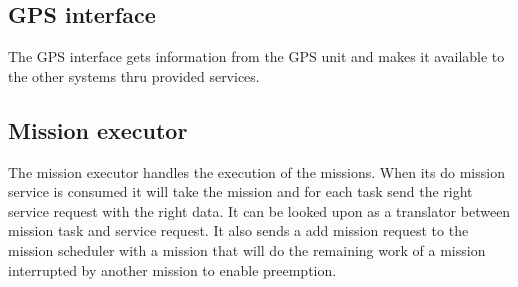 \documentclass{article}
\begin{document}
\subsection{GPS interface}
The GPS interface gets information from the GPS unit and makes it available to the other systems thru provided services.

\subsection{Mission executor}
The mission executor handles the execution of the missions. When its do mission service is consumed it will take the mission and for each task send the right service request with the right data. It can be looked upon as a translator between mission task and service request.
It also sends a add mission request to the mission scheduler with a mission that will do the remaining work of a mission interrupted by another mission to enable preemption.
\end{document}
